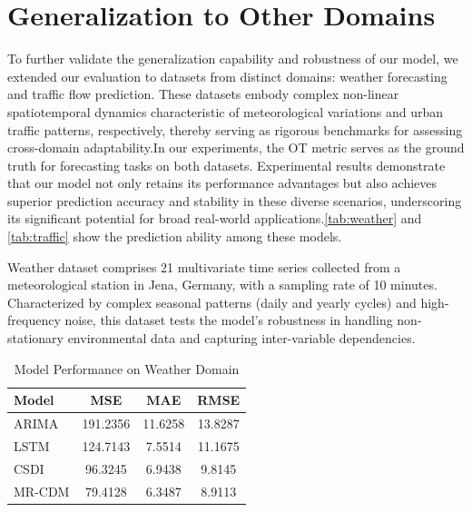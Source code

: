 \section{Generalization to Other Domains}
\label{sec:Generalization}
To further validate the generalization capability and robustness of our model, we extended our evaluation to datasets from distinct domains: weather forecasting and traffic flow prediction. These datasets embody complex non-linear spatiotemporal dynamics characteristic of meteorological variations and urban traffic patterns, respectively, thereby serving as rigorous benchmarks for assessing cross-domain adaptability.In our experiments, the OT metric serves as the ground truth for forecasting tasks on both datasets. Experimental results demonstrate that our model not only retains its performance advantages but also achieves superior prediction accuracy and stability in these diverse scenarios, underscoring its significant potential for broad real-world applications.\autoref{tab:weather} and \autoref{tab:traffic} show the prediction ability among these models.


Weather dataset comprises 21 multivariate time series collected from a meteorological station in Jena, Germany, with a sampling rate of 10 minutes. Characterized by complex seasonal patterns (daily and yearly cycles) and high-frequency noise, this dataset tests the model's robustness in handling non-stationary environmental data and capturing inter-variable dependencies.


\begin{table}[h]
\centering
\caption{Model Performance on Weather Domain}
\label{tab:weather}
\begin{tabular}{lccc}
\hline
Model & MSE & MAE & RMSE \\ \hline
ARIMA & {191.2356} & {11.6258} & {13.8287} \\
LSTM & {124.7143} & {7.5514} & {11.1675}\\
CSDI & {96.3245} & {6.9438} & {9.8145}\\
MR-CDM & {79.4128} & {6.3487} & {8.9113} \\
\hline
\end{tabular}
\end{table}


